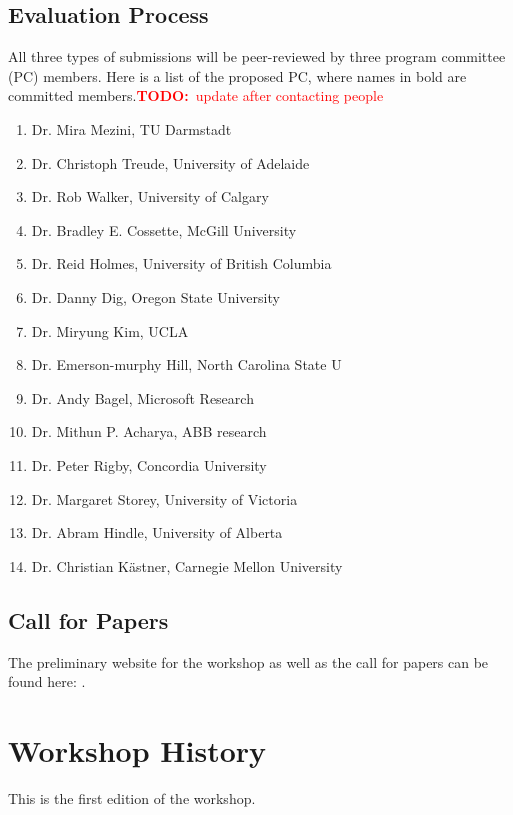 \documentclass[10pt, conference]{IEEEtran}
\newcommand{\todo}[1]{{\textcolor{red}{\textbf{TODO:}~#1}}}
\begin{document}
\subsection{Evaluation Process}
All three types of submissions will be peer-reviewed by three program committee (PC) members. Here is a list of the proposed PC, where names in bold are committed members.\todo{update after contacting people}

\begin{enumerate}
\item Dr. Mira Mezini, TU Darmstadt
\item Dr. Christoph Treude, University of Adelaide 
\item Dr. Rob Walker, University of Calgary
\item Dr. Bradley E. Cossette, McGill University
\item Dr. Reid Holmes, University of British Columbia
\item Dr. Danny Dig, Oregon State University
\item Dr. Miryung Kim, UCLA
\item Dr. Emerson-murphy Hill, North Carolina State U
\item Dr. Andy Bagel, Microsoft Research
\item Dr. Mithun P. Acharya, ABB research
\item Dr. Peter Rigby, Concordia University
\item Dr. Margaret Storey, University of Victoria
\item Dr. Abram Hindle, University of Alberta
\item Dr. Christian K\"{a}stner, Carnegie Mellon University
\end{enumerate}

\subsection{Call for Papers}
The preliminary website for the workshop as well as the call for papers can be found here: \url{}.

\section{Workshop History}

This is the first edition of the workshop.
\end{document}
